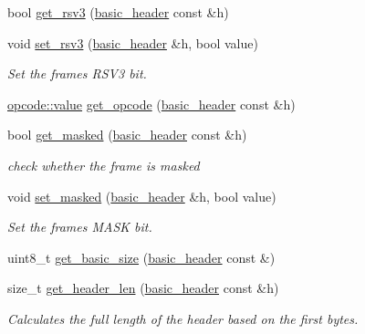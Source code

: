 \begin{DoxyCompactItemize}
bool \hyperlink{namespacewebsocketpp_1_1frame_afc9bce4c9fdbe9fe78e884c8858cccac}{get\+\_\+rsv3} (\hyperlink{structwebsocketpp_1_1frame_1_1basic__header}{basic\+\_\+header} const \&h)
\item 
void \hyperlink{namespacewebsocketpp_1_1frame_a293e2ed0dd6efa704f27c29a1e595715}{set\+\_\+rsv3} (\hyperlink{structwebsocketpp_1_1frame_1_1basic__header}{basic\+\_\+header} \&h, bool value)
\begin{DoxyCompactList}\small\item\em Set the frame\textquotesingle{}s R\+S\+V3 bit. \end{DoxyCompactList}\item 
\hyperlink{namespacewebsocketpp_1_1frame_1_1opcode_ae68711643096dfc4af6d66ade3f9fd5e}{opcode\+::value} \hyperlink{namespacewebsocketpp_1_1frame_af72de43b056cf14e66b3c5b0e648f96c}{get\+\_\+opcode} (\hyperlink{structwebsocketpp_1_1frame_1_1basic__header}{basic\+\_\+header} const \&h)
\item 
bool \hyperlink{namespacewebsocketpp_1_1frame_a4e8cf8ae88a7a8fdb2b3ea86623d01d2}{get\+\_\+masked} (\hyperlink{structwebsocketpp_1_1frame_1_1basic__header}{basic\+\_\+header} const \&h)
\begin{DoxyCompactList}\small\item\em check whether the frame is masked \end{DoxyCompactList}\item 
void \hyperlink{namespacewebsocketpp_1_1frame_a9adfd26ffa9dccf738e6b62b5dccf7f0}{set\+\_\+masked} (\hyperlink{structwebsocketpp_1_1frame_1_1basic__header}{basic\+\_\+header} \&h, bool value)
\begin{DoxyCompactList}\small\item\em Set the frame\textquotesingle{}s M\+A\+S\+K bit. \end{DoxyCompactList}\item 
uint8\+\_\+t \hyperlink{namespacewebsocketpp_1_1frame_a0b9efbf554fb766c9661b68a613612fb}{get\+\_\+basic\+\_\+size} (\hyperlink{structwebsocketpp_1_1frame_1_1basic__header}{basic\+\_\+header} const \&)
\item 
size\+\_\+t \hyperlink{namespacewebsocketpp_1_1frame_abd4f23c906cc48fb3b34603fd4284b01}{get\+\_\+header\+\_\+len} (\hyperlink{structwebsocketpp_1_1frame_1_1basic__header}{basic\+\_\+header} const \&h)
\begin{DoxyCompactList}\small\item\em Calculates the full length of the header based on the first bytes. \end{DoxyCompactList}\item 

\end{DoxyCompactItemize}
